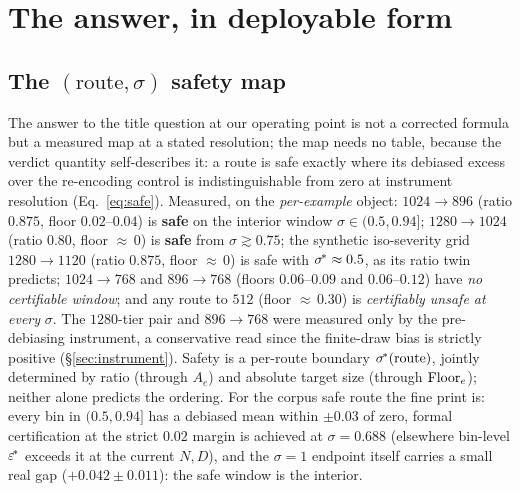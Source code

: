 \section{The answer, in deployable form}
\label{sec:practical}

\subsection{The $(\text{route}, \sigma)$ safety map}
\label{sec:map}

The answer to the title question at our operating point is not a
corrected formula but a measured map at a stated resolution; the
map needs no table, because the verdict quantity self-describes it: a
route is safe exactly where its debiased excess over the re-encoding
control is indistinguishable from zero at instrument resolution
(Eq.~\ref{eq:safe}). Measured, on the \emph{per-example} object:
$1024{\to}896$ (ratio $0.875$, floor
$0.02$--$0.04$) is \textbf{safe} on the interior window
$\sigma \in (0.5, 0.94]$; $1280{\to}1024$ (ratio $0.80$, floor
${\approx}\,0$) is \textbf{safe} from $\sigma \gtrsim 0.75$; the
synthetic iso-severity grid $1280{\to}1120$ (ratio $0.875$, floor
${\approx}\,0$) is safe with $\sigma^{\!*} \approx 0.5$, as its ratio twin
predicts; $1024{\to}768$ and $896{\to}768$ (floors $0.06$--$0.09$ and
$0.06$--$0.12$) have \emph{no certifiable window}; and any route to
$512$ (floor ${\approx}\,0.30$) is \emph{certifiably unsafe at every}
$\sigma$. The $1280$-tier pair and $896{\to}768$ were measured only by
the pre-debiasing instrument, a conservative read since the
finite-draw bias is strictly positive (\S\ref{sec:instrument}). Safety
is a per-route boundary $\sigma^{\!*}(\text{route})$, jointly determined
by ratio (through $A_e$)
and absolute target size (through $\mathrm{Floor}_e$); neither alone predicts
the ordering. For the corpus safe route the fine print is: every bin in
$(0.5, 0.94]$ has a debiased mean within $\pm 0.03$ of zero, formal
certification at the strict $0.02$ margin is achieved at
$\sigma = 0.688$ (elsewhere bin-level $\varepsilon^{\!*}$ exceeds it at the
current $N, D$), and the $\sigma{=}1$ endpoint itself carries a small
real gap ($+0.042 \pm 0.011$): the safe window is the interior.

